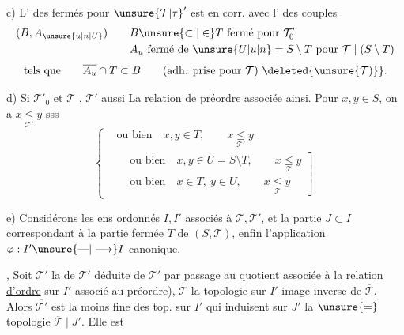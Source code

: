 c) L' des fermés pour ${\unsure{\mathcal{T}|\tau}}'$ est en corr.  avec l' des couples
\[
\begin{aligned}
(B,A_{\unsure{u|n|U}}) \qquad & B\unsure{\subset|\in}T\ \text{fermé pour }\mathcal{T}'_0\\
& A_u\ \text{fermé de }\unsure{U|u|n}=S\setminus T\ \text{pour }\mathcal{T}\mid(S\setminus T)
\end{aligned}
\]
\[
\text{tels que}\qquad \overline{A_u}\cap T\subset B \qquad
\text{(adh. prise pour }\mathcal{T}\text{)}\ \deleted{\unsure{\mathcal{T})}}.
\]

d) Si $\mathcal{T}'_0$ et $\mathcal{T}$ , $\mathcal{T}'$ aussi La relation de préordre associée   ainsi. Pour $x,y\in S$, on a $x\underset{\mathcal{T}'}{\leq}y$ sss
\[
\left\{\begin{aligned}
&\text{ou bien}\quad x,y\in T,\qquad x\underset{\mathcal{T}'}{\leq}y\\
&\left.\begin{aligned}
&\text{ou bien}\quad x,y\in U=S\setminus T,\qquad x\underset{\mathcal{T}}{\leq}y\\
&\text{ou bien}\quad x\in T,\ y\in U,\qquad x\underset{\mathcal{T}}{\leq}y
\end{aligned}\right]
\end{aligned}\right.
\]

e)  Considérons les ens ordonnés $I,I'$ associés à $\mathcal{T},\mathcal{T}'$, et la partie  $J\subset I$ correspondant à la partie fermée $T$ de $(S,\mathcal{T})$, enfin l'application $\varphi:I'\unsure{\mathbin{\text{---}}|\longrightarrow}I$ canonique.

,  Soit $\overline{\mathcal{T}'}$  la  de $\mathcal{T}'$ déduite de $\mathcal{T}'$ par passage au quotient  associée à la relation \uline{d'ordre} sur $I'$ associé au préordre), $\widetilde{\mathcal{T}}$ la topologie sur $I'$ image inverse de $\overline{\mathcal{T}}$. Alors $\overline{\mathcal{T}'}$ est la moins fine des top. sur $I'$ qui  induisent sur $J'$ la $\unsure{=}$  topologie $\overline{\mathcal{T}}\mid J'$. Elle est
